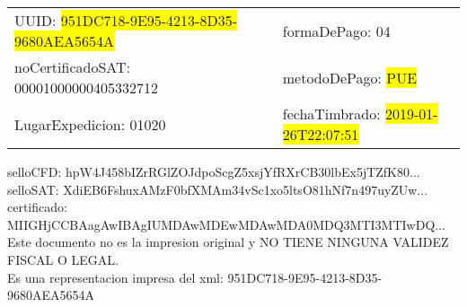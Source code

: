 \documentclass{article}
\begin{document}
\begin{tabular}{p{11cm}p{1cm}p{8cm}}
\bigskip
UUID: \colorbox{yellow}{ 951DC718-9E95-4213-8D35-9680AEA5654A } & & formaDePago: 04\\

noCertificadoSAT: 00001000000405332712 & & metodoDePago: \colorbox{yellow}{ PUE }\\

LugarExpedicion: 01020 & & fechaTimbrado: \colorbox{yellow}{ 2019-01-26T22:07:51 } \\
\end{tabular}

\bigskip
selloCFD: hpW4J458bIZrRGlZOJdpoScgZ5xsjYfRXrCB30lbEx5jTZfK80... \\
selloSAT: XdiEB6FshuxAMzF0bfXMAm34vSc1xo5ltsO81hNf7n497uyZUw... \\

certificado: MIIGHjCCBAagAwIBAgIUMDAwMDEwMDAwMDA0MDQ3MTI3MTIwDQ...\bigskip\bigskip\bigskip\bigskip\bigskip\bigskip
\\Este documento no es la impresion original y NO TIENE NINGUNA VALIDEZ FISCAL O LEGAL. \\
 Es una representacion impresa del xml:  951DC718-9E95-4213-8D35-9680AEA5654A \\
\end{document}
